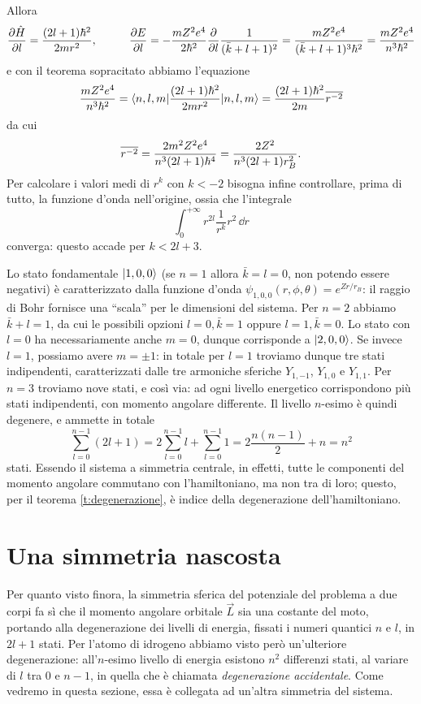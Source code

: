 Allora
\begin{equation}
	\frac{\partial {\hat{H}}}{\partial {l}}=\frac{(2l+1)\hbar^2}{2mr^2},
	\hspace{1cm}
	\frac{\partial {E}}{\partial {l}}=-\frac{mZ^2e^4}{2\hbar^2}\frac{\partial {}}{\partial {l}}\frac1{(\bar{k}+l+1)^2}=\frac{mZ^2e^4}{(\bar{k}+l+1)^3\hbar^2}=\frac{mZ^2e^4}{n^3\hbar^2}
\end{equation}
e con il teorema sopracitato abbiamo l'equazione
\begin{equation}
	\frac{mZ^2e^4}{n^3\hbar^2}=\langle n,l,m\rvert\frac{(2l+1)\hbar^2}{2mr^2}\lvert n,l,m\rangle=\frac{(2l+1)\hbar^2}{2m}\overline{r^{-2}}
\end{equation}
da cui
\begin{equation}
	\overline{r^{-2}}=\frac{2m^2Z^2e^4}{n^3(2l+1)\hbar^4}=\frac{2Z^2}{n^3(2l+1)r_B^2}.
\end{equation}
Per calcolare i valori medi di $r^k$ con $k<-2$ bisogna infine controllare, prima di tutto, la funzione d'onda nell'origine, ossia che l'integrale
\begin{equation}
	\int_0^{+\infty}r^{2l}\frac1{r^k}r^2\,\dd r
\end{equation}
converga: questo accade per $k<2l+3$.

Lo stato fondamentale $\lvert1,0,0\rangle$ (se $n=1$ allora $\bar{k}=l=0$, non potendo essere negativi) è caratterizzato dalla funzione d'onda $\psi_{1,0,0}(r,\phi,\theta)=e^{Zr/r_B}$: il raggio di Bohr fornisce una ``scala'' per le dimensioni del sistema.
Per $n=2$ abbiamo $\bar{k}+l=1$, da cui le possibili opzioni $l=0,\bar{k}=1$ oppure $l=1,\bar{k}=0$.
Lo stato con $l=0$ ha necessariamente anche $m=0$, dunque corrisponde a $\lvert2,0,0\rangle$.
Se invece $l=1$, possiamo avere $m=\pm 1$: in totale per $l=1$ troviamo dunque tre stati indipendenti, caratterizzati dalle tre armoniche sferiche $Y_{1,-1}$, $Y_{1,0}$ e $Y_{1,1}$.
Per $n=3$ troviamo nove stati, e cos\`i via: ad ogni livello energetico corrispondono più stati indipendenti, con momento angolare differente.
Il livello $n$-esimo è quindi degenere, e ammette in totale
\begin{equation}
	\sum_{l=0}^{n-1}(2l+1)=2\sum_{l=0}^{n-1}l+\sum_{l=0}^{n-1}1=2\frac{n(n-1)}2+n=n^2
\end{equation}
stati.
Essendo il sistema a simmetria centrale, in effetti, tutte le componenti del momento angolare commutano con l'hamiltoniano, ma non tra di loro; questo, per il teorema \ref{t:degenerazione}, è indice della degenerazione dell'hamiltoniano.

\section{Una simmetria nascosta}
Per quanto visto finora, la simmetria sferica del potenziale del problema a due corpi fa s\`i che il momento angolare orbitale $\vec L$ sia una costante del moto, portando alla degenerazione dei livelli di energia, fissati i numeri quantici $n$ e $l$, in $2l+1$ stati.
Per l'atomo di idrogeno abbiamo visto però un'ulteriore degenerazione: all'$n$-esimo livello di energia esistono $n^2$ differenzi stati, al variare di $l$ tra $0$ e $n-1$, in quella che è chiamata \emph{degenerazione accidentale}.
Come vedremo in questa sezione, essa è collegata ad un'altra simmetria del sistema.

